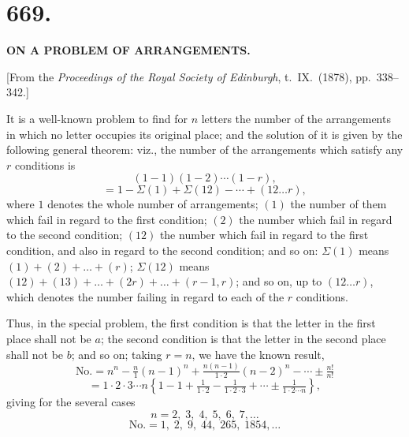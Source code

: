 \documentclass[11pt,a4paper]{article}
\begin{document}
\newpage



\section*{669.}

\begin{center}
\textbf{ON A PROBLEM OF ARRANGEMENTS.}
\end{center}

\medskip

\begin{center}
[From the \emph{Proceedings of the Royal Society of Edinburgh}, t.~IX.\ (1878), pp.~338--342.]
\end{center}

\medskip

\noindent It is a well-known problem to find for $n$ letters the number of the arrangements in which no letter occupies its original place; and the solution of it is given by the following general theorem: viz., the number of the arrangements which satisfy any $r$ conditions is
\[
(1 - 1)(1 - 2)\cdots(1 - r),
\]
\[
= 1 - \Sigma(1) + \Sigma(12) - \cdots + (12 \ldots r),
\]
where $1$ denotes the whole number of arrangements; $(1)$ the number of them which fail in regard to the first condition; $(2)$ the number which fail in regard to the second condition; $(12)$ the number which fail in regard to the first condition, and also in regard to the second condition; and so on: $\Sigma(1)$ means $(1) + (2) + \ldots + (r)$; $\Sigma(12)$ means $(12) + (13) + \ldots + (2r) + \ldots + (r - 1, r)$; and so on, up to $(12\ldots r)$, which denotes the number failing in regard to each of the $r$ conditions.

\medskip

Thus, in the special problem, the first condition is that the letter in the first place shall not be $a$; the second condition is that the letter in the second place shall not be $b$; and so on; taking $r = n$, we have the known result,
\[
\text{No.} = n^{n} - \tfrac{n}{1}(n - 1)^{n} + \tfrac{n(n-1)}{1\cdot 2}(n - 2)^{n} - \cdots \pm \tfrac{n!}{n!}
\]
\[
= 1\cdot 2\cdot 3\cdots n\left\{1 - 1 + \tfrac{1}{1\cdot 2} - \tfrac{1}{1\cdot 2\cdot 3} + \cdots \pm \tfrac{1}{1\cdot 2\cdots n}\right\},
\]
giving for the several cases
\[
n = 2,\; 3,\; 4,\; 5,\; 6,\; 7, \ldots
\]
\[
\text{No.} = 1,\; 2,\; 9,\; 44,\; 265,\; 1854, \ldots
\]
\end{document}
